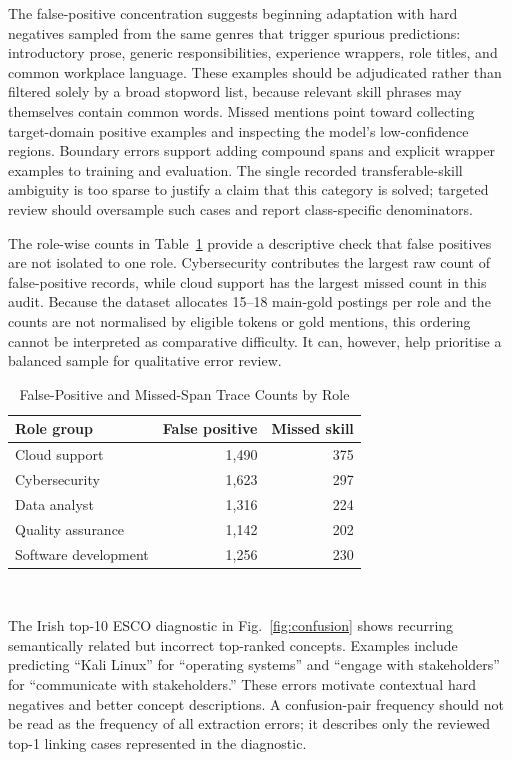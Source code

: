 \documentclass[conference]{IEEEtran}
\begin{document}
The false-positive concentration suggests beginning adaptation with hard negatives sampled from the same genres that trigger spurious predictions: introductory prose, generic responsibilities, experience wrappers, role titles, and common workplace language. These examples should be adjudicated rather than filtered solely by a broad stopword list, because relevant skill phrases may themselves contain common words. Missed mentions point toward collecting target-domain positive examples and inspecting the model's low-confidence regions. Boundary errors support adding compound spans and explicit wrapper examples to training and evaluation. The single recorded transferable-skill ambiguity is too sparse to justify a claim that this category is solved; targeted review should oversample such cases and report class-specific denominators.

The role-wise counts in Table~\ref{tab:role-errors} provide a descriptive check that false positives are not isolated to one role. Cybersecurity contributes the largest raw count of false-positive records, while cloud support has the largest missed count in this audit. Because the dataset allocates 15--18 main-gold postings per role and the counts are not normalised by eligible tokens or gold mentions, this ordering cannot be interpreted as comparative difficulty. It can, however, help prioritise a balanced sample for qualitative error review.

\begin{table}[!t]
\caption{False-Positive and Missed-Span Trace Counts by Role}
\label{tab:role-errors}
\centering
\small
\begin{tabular}{lrr}
\toprule
Role group & False positive & Missed skill \\
\midrule
Cloud support & 1,490 & 375 \\
Cybersecurity & 1,623 & 297 \\
Data analyst & 1,316 & 224 \\
Quality assurance & 1,142 & 202 \\
Software development & 1,256 & 230 \\
\bottomrule
\end{tabular}
\\[1mm]
\par\vspace{1mm}{\footnotesize Counts are audit records, not role-normalised rates. Source: current Irish trace audit.}
\end{table}

The Irish top-10 ESCO diagnostic in Fig.~\ref{fig:confusion} shows recurring semantically related but incorrect top-ranked concepts. Examples include predicting ``Kali Linux'' for ``operating systems'' and ``engage with stakeholders'' for ``communicate with stakeholders.'' These errors motivate contextual hard negatives and better concept descriptions. A confusion-pair frequency should not be read as the frequency of all extraction errors; it describes only the reviewed top-1 linking cases represented in the diagnostic.
\end{document}
